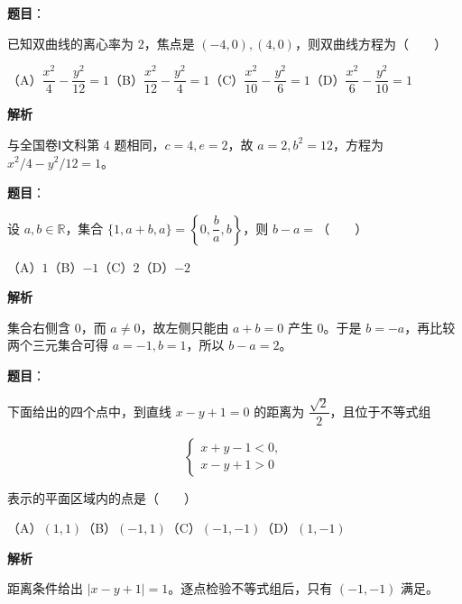 \begin{answer}

\textbf{题目}：

已知双曲线的离心率为 $2$，焦点是 $(-4,0),(4,0)$，则双曲线方程为\mbox{（　　）}

（A）$\dfrac{x^2}{4}-\dfrac{y^2}{12}=1$\quad（B）$\dfrac{x^2}{12}-\dfrac{y^2}{4}=1$\quad（C）$\dfrac{x^2}{10}-\dfrac{y^2}{6}=1$\quad（D）$\dfrac{x^2}{6}-\dfrac{y^2}{10}=1$

\textbf{解析}

与全国卷Ⅰ文科第 4 题相同，$c=4,e=2$，故 $a=2,b^2=12$，方程为 $x^2/4-y^2/12=1$。


\end{answer}
\begin{answer}

\textbf{题目}：

设 $a,b\in\mathbb R$，集合 $\{1,a+b,a\}=\left\{0,\dfrac ba,b\right\}$，则 $b-a=$\mbox{（　　）}

（A）$1$\quad（B）$-1$\quad（C）$2$\quad（D）$-2$

\textbf{解析}

集合右侧含 $0$，而 $a\ne0$，故左侧只能由 $a+b=0$ 产生 $0$。于是 $b=-a$，再比较两个三元集合可得 $a=-1,b=1$，所以 $b-a=2$。


\end{answer}
\begin{answer}

\textbf{题目}：

下面给出的四个点中，到直线 $x-y+1=0$ 的距离为 $\dfrac{\sqrt2}{2}$，且位于不等式组

\nopagebreak[4]
\[
\begin{cases}
x+y-1<0,\\
x-y+1>0
\end{cases}
\]

表示的平面区域内的点是\mbox{（　　）}

（A）$(1,1)$\quad（B）$(-1,1)$\quad（C）$(-1,-1)$\quad（D）$(1,-1)$

\textbf{解析}

距离条件给出 $|x-y+1|=1$。逐点检验不等式组后，只有 $(-1,-1)$ 满足。


\end{answer}
